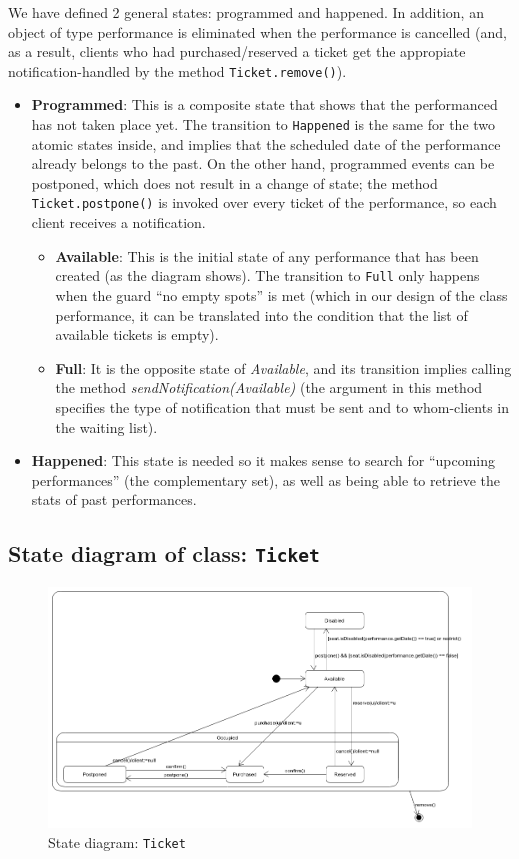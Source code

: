 \documentclass{article}
\begin{document}
We have defined 2 general states: programmed and happened. In addition, an object of type performance is eliminated when the performance is cancelled (and, as a result, clients who had purchased/reserved a ticket get the appropiate notification-handled by the method \texttt{Ticket.remove()}).
\begin{itemize}
    \item \textbf{Programmed}: This is a composite state that shows that the performanced has not taken place yet. The transition to \texttt{Happened} is the same for the two atomic states inside, and implies that the scheduled date of the performance already belongs to the past. On the other hand, programmed events can be postponed, which does not result in a change of state; the method \texttt{Ticket.postpone()} is invoked over every ticket of the performance, so each client receives a notification. 
    \begin{itemize}
        \item \textbf{Available}: This is the initial state of any performance that has been created (as the diagram shows). The transition to \texttt{Full} only happens when the guard ``no empty spots'' is met (which in our design of the class performance, it can be translated into the condition that the list of available tickets is empty).
        \item \textbf{Full}: It is the opposite state of \textit{Available}, and its transition implies calling the method \textit{sendNotification(Available)} (the argument in this method specifies the type of notification that must be sent and to whom-clients in the waiting list).
    \end{itemize}
    \item \textbf{Happened}: This state is needed so it makes sense to search for ``upcoming performances'' (the complementary set), as well as being able to retrieve the stats of past performances.
\end{itemize}
\newpage

\subsection{State diagram of class: \texttt{Ticket}}

\begin{figure}[h]
    \centering
    \includegraphics[width=400pt]{../state1/s1}
    \caption{State diagram: \texttt{Ticket}}\label{state1}
\end{figure}
\end{document}
